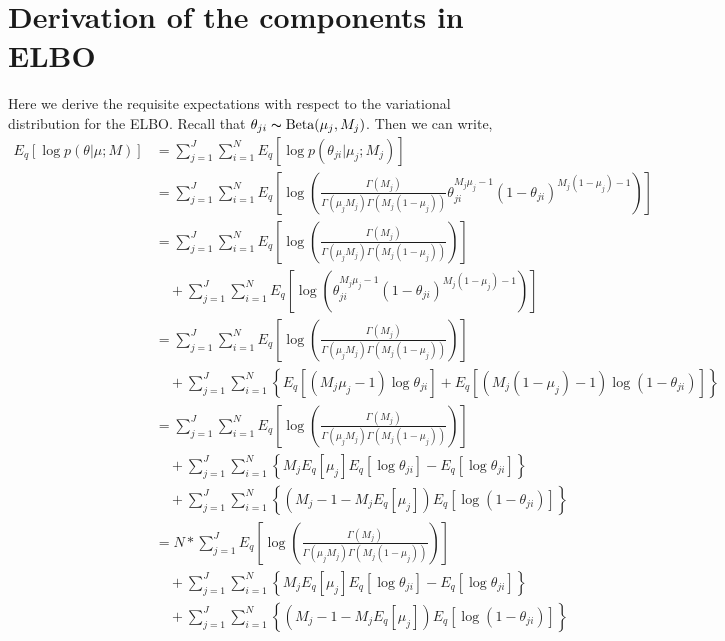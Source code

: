 \documentclass[11pt,reqno]{amsart}
\begin{document}
\section{Derivation of the components in ELBO}
\label{appendix:ELBO}
Here we derive the requisite expectations with respect to the variational distribution for the ELBO.
%
Recall that $\theta_{ji} \thicksim \text{Beta}(\mu_j, M_j)$.
Then we can write,
\begin{equation}
\begin{split}
E_q \left[ \log p\left(\theta | \mu; M \right)\right] &= \sum_{j=1}^{J} \sum_{i=1}^{N} E_q \left[ \log p\left(\theta_{ji} | \mu_j; M_j \right)\right] \\
&= \sum_{j=1}^{J} \sum_{i=1}^{N}  E_q  \left[ \log \left( \frac{ \Gamma(M_j) } { \Gamma(\mu_j M_j) \Gamma(M_j (1-\mu_j)) } \theta_{ji}^{M_j\mu_j -1} (1 - \theta_{ji})^{M_j ( 1 - \mu_j) - 1} \right) \right] \\
&= \sum_{j=1}^{J} \sum_{i=1}^{N} E_q  \left[ \log \left( \frac{ \Gamma(M_j) } { \Gamma(\mu_j M_j) \Gamma(M_j (1-\mu_j)) }\right) \right] \\
&\quad + \sum_{j=1}^{J} \sum_{i=1}^{N}  E_q  \left[ \log \left( \theta_{ji}^{M_j\mu_j -1} (1 - \theta_{ji})^{M_j ( 1 - \mu_j) - 1} \right) \right] \\
&= \sum_{j=1}^{J} \sum_{i=1}^{N} E_q  \left[ \log \left( \frac{ \Gamma(M_j) } { \Gamma(\mu_j M_j) \Gamma(M_j (1-\mu_j)) }\right) \right]  \\
&\quad + \sum_{j=1}^{J} \sum_{i=1}^{N} \left\lbrace E_q \left[ \left( M_j\mu_j -1 \right) \log \theta_{ji} \right] + E_q \left[ \left( M_j ( 1 - \mu_j) - 1 \right) \log \left( 1 - \theta_{ji} \right) \right]\right\rbrace \\
&= \sum_{j=1}^{J} \sum_{i=1}^{N} E_q  \left[ \log \left( \frac{ \Gamma(M_j) } { \Gamma(\mu_j M_j) \Gamma(M_j (1-\mu_j)) }\right) \right] \\
&\quad + \sum_{j=1}^{J} \sum_{i=1}^{N} \left\lbrace M_j E_q \left[ \mu_j \right] E_q \left[ \log \theta_{ji} \right] - E_q  \left[ \log \theta_{ji} \right] \right\rbrace\\
&\quad + \sum_{j=1}^{J} \sum_{i=1}^{N} \left\lbrace \left( M_j - 1 - M_j E_q\left[ \mu_j \right]  \right) E_q\left[ \log \left( 1 - \theta_{ji}\right) \right] \right\rbrace\\
&= N* \sum_{j=1}^{J} E_q  \left[ \log \left( \frac{ \Gamma(M_j) } { \Gamma(\mu_j M_j) \Gamma(M_j (1-\mu_j)) }\right) \right] \\
&\quad + \sum_{j=1}^{J} \sum_{i=1}^{N} \left\lbrace M_j E_q \left[ \mu_j \right] E_q \left[ \log \theta_{ji} \right] - E_q  \left[ \log \theta_{ji} \right] \right\rbrace\\
&\quad + \sum_{j=1}^{J} \sum_{i=1}^{N} \left\lbrace \left( M_j - 1 - M_j E_q\left[ \mu_j \right]  \right) E_q\left[ \log \left( 1 - \theta_{ji}\right) \right] \right\rbrace
\end{split}
\end{equation}
\end{document}
